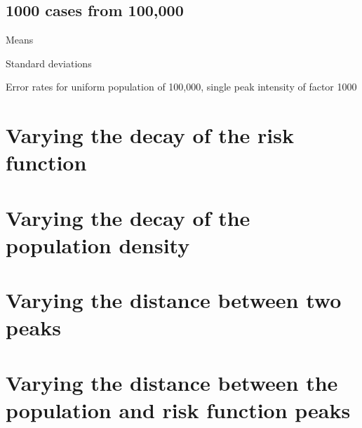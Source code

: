 \subsection{1000 cases from 100,000}
\begin{table}[H]
\centering
\scriptsize

    \begin{subtable}{0.5\textwidth}
    
    \caption{Means} 
    \end{subtable}%
    \begin{subtable}{0.5\textwidth}
    
    \caption{Standard deviations} 
    \end{subtable}

\caption{Error rates for uniform population of 100,000, single peak intensity of factor 1000}
\label{tbl:mean_error_rates:unif100k_1000_1_1h}
\end{table}

\section{Varying the decay of the risk function}

\section{Varying the decay of the population density}

\section{Varying the distance between two peaks}

\section{Varying the distance between the population and risk function peaks}


